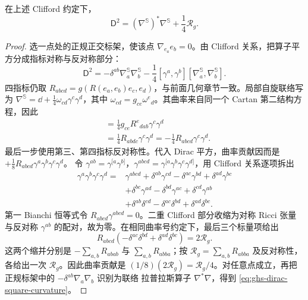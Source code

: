 \begin{theorem}[Lichnerowicz 公式]
\label{thm:ghs-lichnerowicz-spinor}
在上述 Clifford 约定下，
\begin{equation}\label{eq:ghs-dirac-square-curvature}
 \mathsf D^2=(\nabla^{\mathbb S})^*\nabla^{\mathbb S}+\frac14\mathcal R_g.
\end{equation}
\end{theorem}
\begin{proof}
选一点处的正规正交标架，使该点 $\nabla_{e_a}e_b=0$。由 Clifford 关系，把算子平方分成指标对称与反对称部分：
\[
 \mathsf D^2=-\delta^{ab}\nabla_a^{\mathbb S}\nabla_b^{\mathbb S}
 -\frac14[\gamma^a,\gamma^b][\nabla_a^{\mathbb S},\nabla_b^{\mathbb S}].
\]
四指标仍取 $R_{abcd}=g(R(e_a,e_b)e_c,e_d)$，与前面几何章节一致。局部自旋联络写为 $\nabla^{\mathbb S}=\dd+\tfrac14\omega_{cd}\gamma^c\gamma^d$，其中 $\omega_{cd}=g_{ce}\omega^e{}_d$。其曲率来自同一个 Cartan 第二结构方程，因此
\begin{align*}
 [\nabla_a^{\mathbb S},\nabla_b^{\mathbb S}]
 &=\frac14g_{ce}R^e{}_{dab}\gamma^c\gamma^d\\
 &=\frac14R_{abdc}\gamma^c\gamma^d
 =-\frac14R_{abcd}\gamma^c\gamma^d.
\end{align*}
最后一步使用第三、第四指标反对称性。代入 Dirac 平方，曲率贡献因而是 $+\tfrac18R_{abcd}\gamma^a\gamma^b\gamma^c\gamma^d$。
令 $\gamma^{ab}=\gamma^{[a}\gamma^{b]}$，$\gamma^{abcd}=\gamma^{[a}\gamma^b\gamma^c\gamma^{d]}$，用 Clifford 关系逐项拆出
\begin{align*}
\gamma^a\gamma^b\gamma^c\gamma^d
={}&\gamma^{abcd}
+\delta^{ab}\gamma^{cd}-\delta^{ac}\gamma^{bd}+\delta^{ad}\gamma^{bc}\\
&+\delta^{bc}\gamma^{ad}-\delta^{bd}\gamma^{ac}+\delta^{cd}\gamma^{ab}\\
&+\delta^{ab}\delta^{cd}-\delta^{ac}\delta^{bd}+\delta^{ad}\delta^{bc}.
\end{align*}
第一 Bianchi 恒等式令 $R_{abcd}\gamma^{abcd}=0$。二重 Clifford 部分收缩为对称 Ricci 张量与反对称 $\gamma^{ab}$ 的配对，故为零。在相同曲率号约定下，最后三个标量项给出
\[
 R_{abcd}(-\delta^{ac}\delta^{bd}+\delta^{ad}\delta^{bc})=2\mathcal R_g.
\]
这两个缩并分别是 $-\sum_{a,b}R_{abab}$ 与 $\sum_{a,b}R_{abba}$；按 $\mathcal R_g=\sum_{a,b}R_{abba}$ 及反对称性，各给出一次 $\mathcal R_g$。因此曲率贡献是 $(1/8)(2\mathcal R_g)=\mathcal R_g/4$。对任意点成立，再把正规标架中的 $-\delta^{ab}\nabla_a\nabla_b$ 识别为联络 拉普拉斯算子 $\nabla^*\nabla$，得到 \cref{eq:ghs-dirac-square-curvature}。
\end{proof}

